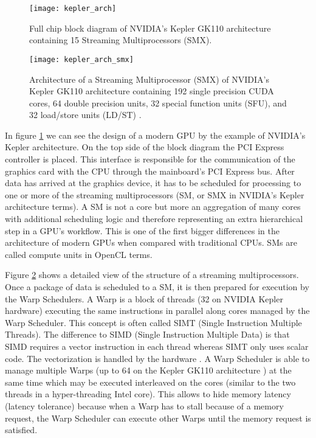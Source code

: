 \begin{figure}
\centering
\texttt{[image: kepler\_arch]}
\caption{Full chip block diagram of NVIDIA's Kepler GK110 architecture containing 15 Streaming Multiprocessors (SMX). \cite{kepler_arch}}
\label{fig:kepler_arch}
\end{figure}

\begin{figure}
\centering
\texttt{[image: kepler\_arch\_smx]}
\caption{Architecture of a Streaming Multiprocessor (SMX) of NVIDIA's Kepler GK110 architecture containing 192 single precision CUDA cores, 64 double precision units, 32 special function units (SFU), and 32 load/store units (LD/ST) \cite{kepler_arch}.}
\label{fig:kepler_arch_smx}
\end{figure}

In figure \ref{fig:kepler_arch} we can see the design of a modern GPU by the example of NVIDIA's Kepler architecture. On the top side of the block diagram the PCI Express controller is placed. This interface is responsible for the communication of the graphics card with the CPU through the mainboard's PCI Express bus. After data has arrived at the graphics device, it has to be scheduled for processing to one or more of the streaming multiprocessors (SM, or SMX in NVIDIA's Kepler architecture terms). A SM is not a core but more an aggregation of many cores with additional scheduling logic and therefore representing an extra hierarchical step in a GPU's workflow. This is one of the first bigger differences in the architecture of modern GPUs when compared with traditional CPUs. SMs are called compute units in OpenCL terms.

Figure \ref{fig:kepler_arch_smx} shows a detailed view of the structure of a streaming multiprocessors. Once a package of data is scheduled to a SM, it is then prepared for execution by the Warp Schedulers. A Warp is a block of threads (32 on NVIDIA Kepler hardware) executing the same instructions in parallel along cores managed by the Warp Scheduler. This concept is often called SIMT (Single Instruction Multiple Threads). The difference to SIMD (Single Instruction Multiple Data) is that SIMD requires a vector instruction in each thread whereas SIMT only uses scalar code. The vectorization is handled by the hardware \cite[p.99]{gpu_optimizations}. A Warp Scheduler is able to manage multiple Warps (up to 64 on the Kepler GK110 architecture \cite[p.7]{kepler_arch}) at the same time which may be executed interleaved on the cores (similar to the two threads in a hyper-threading Intel core). This allows to hide memory latency (latency tolerance) because when a Warp has to stall because of a memory request, the Warp Scheduler can execute other Warps until the memory request is satisfied.

